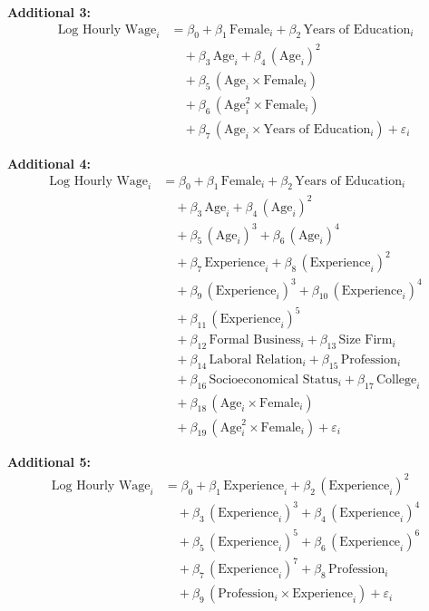 \documentclass[12pt,a4paper,onecolumn]{article}
\begin{document}
\begin{description}[style=nextline, leftmargin=0pt, labelwidth=0pt, labelsep=0pt, itemsep=2pt, topsep=2pt]
\item \textbf{Additional 3:}
\[
\begin{aligned}
\text{Log Hourly Wage}_i
  &= \beta_0 + \beta_1\,\text{Female}_i + \beta_2\,\text{Years of Education}_i \\
  &\quad + \beta_3\,\text{Age}_i + \beta_4\,(\text{Age}_i)^{2} \\
  &\quad + \beta_5\,(\text{Age}_i \times \text{Female}_i) \\
  &\quad + \beta_6\,(\text{Age}_i^{2} \times \text{Female}_i) \\
  &\quad + \beta_7\,(\text{Age}_i \times \text{Years of Education}_i) + \varepsilon_i
\end{aligned}
\]

\item \textbf{Additional 4:}
\[
\begin{aligned}
\text{Log Hourly Wage}_i
  &= \beta_0 + \beta_1\,\text{Female}_i + \beta_2\,\text{Years of Education}_i \\
  &\quad + \beta_3\,\text{Age}_i + \beta_4\,(\text{Age}_i)^{2} \\
  &\quad + \beta_5\,(\text{Age}_i)^{3} + \beta_6\,(\text{Age}_i)^{4} \\
  &\quad + \beta_7\,\text{Experience}_i + \beta_8\,(\text{Experience}_i)^{2} \\
  &\quad + \beta_9\,(\text{Experience}_i)^{3} + \beta_{10}\,(\text{Experience}_i)^{4} \\
  &\quad + \beta_{11}\,(\text{Experience}_i)^{5} \\
  &\quad + \beta_{12}\,\text{Formal Business}_i + \beta_{13}\,\text{Size Firm}_i \\
  &\quad + \beta_{14}\,\text{Laboral Relation}_i + \beta_{15}\,\text{Profession}_i \\
  &\quad + \beta_{16}\,\text{Socioeconomical Status}_i + \beta_{17}\,\text{College}_i \\
  &\quad + \beta_{18}\,(\text{Age}_i \times \text{Female}_i) \\
  &\quad + \beta_{19}\,(\text{Age}_i^{2} \times \text{Female}_i) + \varepsilon_i
\end{aligned}
\]

\item \textbf{Additional 5:}
\[
\begin{aligned}
\text{Log Hourly Wage}_i
  &= \beta_0 + \beta_1\,\text{Experience}_i + \beta_2\,(\text{Experience}_i)^{2} \\
  &\quad + \beta_3\,(\text{Experience}_i)^{3} + \beta_4\,(\text{Experience}_i)^{4} \\
  &\quad + \beta_5\,(\text{Experience}_i)^{5} + \beta_6\,(\text{Experience}_i)^{6} \\
  &\quad + \beta_7\,(\text{Experience}_i)^{7} + \beta_8\,\text{Profession}_i \\
  &\quad + \beta_9\,(\text{Profession}_i \times \text{Experience}_i) + \varepsilon_i
\end{aligned}
\]

\end{description}
\endgroup
\end{document}
